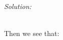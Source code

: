 \documentclass{article}
\newenvironment{solution}
    {\textit{Solution:}}
    {}
\begin{document}
\begin{solution}
\begin{itemize}
\begin{align*}
\end{align*}

Then we see that: 


\end{itemize}
\end{solution}
\end{document}

